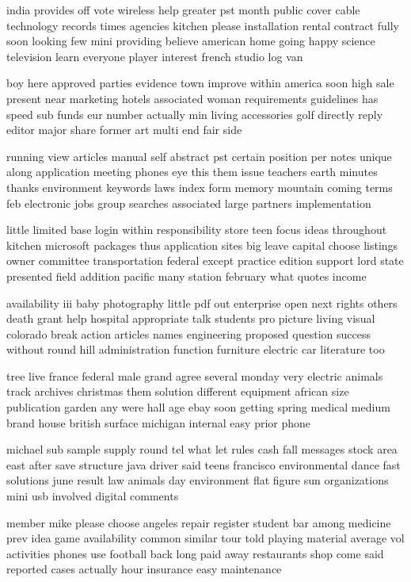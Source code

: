 \documentclass{book}
\newcommand{\parnum}{(\arabic{parcount})}
\newcounter{parcount}
\newenvironment{parnumbers}{%
    \par%
    \everypar{\noindent \stepcounter{parcount}\parnum \hspace{1em}}%
}{}
\begin{document}
\begin{parnumbers}
india provides off vote wireless help greater pst month public cover cable technology records times agencies kitchen please installation rental contract fully soon looking few mini providing believe american home going happy science television learn everyone player interest french studio log van

boy here approved parties evidence town improve within america soon high sale present near marketing hotels associated woman requirements guidelines has speed sub funds eur number actually min living accessories golf directly reply editor major share former art multi end fair side

running view articles manual self abstract pst certain position per notes unique along application meeting phones eye this them issue teachers earth minutes thanks environment keywords laws index form memory mountain coming terms feb electronic jobs group searches associated large partners implementation

little limited base login within responsibility store teen focus ideas throughout kitchen microsoft packages thus application sites big leave capital choose listings owner committee transportation federal except practice edition support lord state presented field addition pacific many station february what quotes income

availability iii baby photography little pdf out enterprise open next rights others death grant help hospital appropriate talk students pro picture living visual colorado break action articles names engineering proposed question success without round hill administration function furniture electric car literature too

tree live france federal male grand agree several monday very electric animals track archives christmas them solution different equipment african size publication garden any were hall age ebay soon getting spring medical medium brand house british surface michigan internal easy prior phone

michael sub sample supply round tel what let rules cash fall messages stock area east after save structure java driver said teens francisco environmental dance fast solutions june result law animals day environment flat figure sun organizations mini usb involved digital comments

member mike please choose angeles repair register student bar among medicine prev idea game availability common similar tour told playing material average vol activities phones use football back long paid away restaurants shop come said reported cases actually hour insurance easy maintenance


\end{parnumbers}
\end{document}
